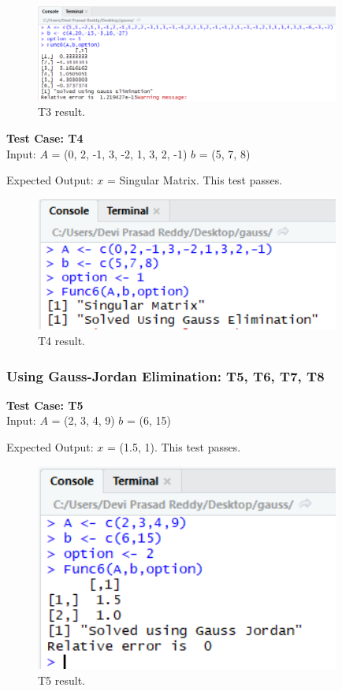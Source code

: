 \documentclass[12pt, titlepage]{article}
\begin{document}
\begin{figure}[H]
\centering
 \includegraphics[width=100mm]{T3}
  \caption{T3 result.}
  \label{fig:T3}
\end{figure}

\textbf{Test Case: T4}\\

Input: $A$ = (0, 2, -1, 3, -2, 1, 3, 2, -1)
$b$ = (5, 7, 8)

Expected Output: $x$ = Singular Matrix. This test passes.

\begin{figure}[H]
\centering
 \includegraphics[width=100mm]{T4}
  \caption{T4 result.}
  \label{fig:T4}
\end{figure}


\subsubsection{Using Gauss-Jordan Elimination: T5, T6, T7, T8}

\textbf{Test Case: T5}\\ 

Input: $A$ = (2, 3, 4, 9)
$b$ = (6, 15)

Expected Output: $x$ = (1.5, 1). This test passes.

\begin{figure}[H]
\centering
 \includegraphics[width=100mm]{T5}
  \caption{T5 result.}
  \label{fig:T5}
\end{figure}
\end{document}

